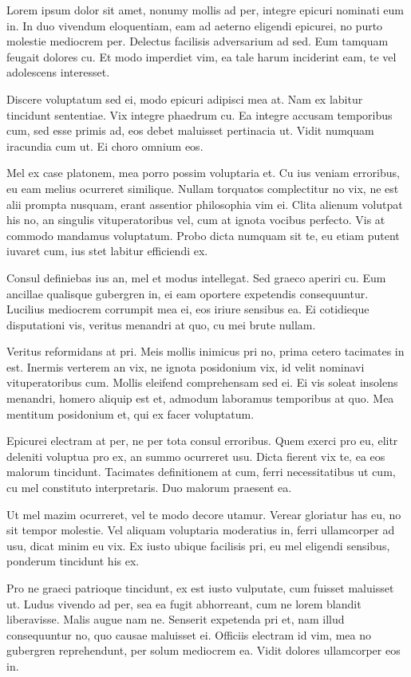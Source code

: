 \documentclass[11pt,a4paper]{report}
\begin{document}
    Lorem ipsum dolor sit amet, nonumy mollis ad per, integre epicuri nominati eum in. In duo vivendum eloquentiam, eam ad aeterno eligendi epicurei, no purto molestie mediocrem per. Delectus facilisis adversarium ad sed. Eum tamquam feugait dolores cu. Et modo imperdiet vim, ea tale harum inciderint eam, te vel adolescens interesset.
    
    Discere voluptatum sed ei, modo epicuri adipisci mea at. Nam ex labitur tincidunt sententiae. Vix integre phaedrum cu. Ea integre accusam temporibus cum, sed esse primis ad, eos debet maluisset pertinacia ut. Vidit numquam iracundia cum ut. Ei choro omnium eos.
    
    Mel ex case platonem, mea porro possim voluptaria et. Cu ius veniam erroribus, eu eam melius ocurreret similique. Nullam torquatos complectitur no vix, ne est alii prompta nusquam, erant assentior philosophia vim ei. Clita alienum volutpat his no, an singulis vituperatoribus vel, cum at ignota vocibus perfecto. Vis at commodo mandamus voluptatum. Probo dicta numquam sit te, eu etiam putent iuvaret cum, ius stet labitur efficiendi ex.
    
    Consul definiebas ius an, mel et modus intellegat. Sed graeco aperiri cu. Eum ancillae qualisque gubergren in, ei eam oportere expetendis consequuntur. Lucilius mediocrem corrumpit mea ei, eos iriure sensibus ea. Ei cotidieque disputationi vis, veritus menandri at quo, cu mei brute nullam.

    Veritus reformidans at pri. Meis mollis inimicus pri no, prima cetero tacimates in est. Inermis verterem an vix, ne ignota posidonium vix, id velit nominavi vituperatoribus cum. Mollis eleifend comprehensam sed ei. Ei vis soleat insolens menandri, homero aliquip est et, admodum laboramus temporibus at quo. Mea mentitum posidonium et, qui ex facer voluptatum.
    
    Epicurei electram at per, ne per tota consul erroribus. Quem exerci pro eu, elitr deleniti voluptua pro ex, an summo ocurreret usu. Dicta fierent vix te, ea eos malorum tincidunt. Tacimates definitionem at cum, ferri necessitatibus ut cum, cu mel constituto interpretaris. Duo malorum praesent ea.
    
    Ut mel mazim ocurreret, vel te modo decore utamur. Verear gloriatur has eu, no sit tempor molestie. Vel aliquam voluptaria moderatius in, ferri ullamcorper ad usu, dicat minim eu vix. Ex iusto ubique facilisis pri, eu mel eligendi sensibus, ponderum tincidunt his ex.
    
    Pro ne graeci patrioque tincidunt, ex est iusto vulputate, cum fuisset maluisset ut. Ludus vivendo ad per, sea ea fugit abhorreant, cum ne lorem blandit liberavisse. Malis augue nam ne. Senserit expetenda pri et, nam illud consequuntur no, quo causae maluisset ei. Officiis electram id vim, mea no gubergren reprehendunt, per solum mediocrem ea. Vidit dolores ullamcorper eos in.
    
\end{document}
